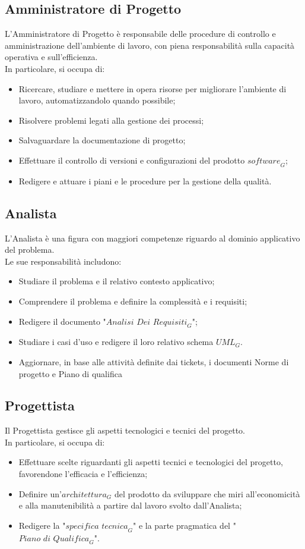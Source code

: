 \subsection{Amministratore di Progetto}
L'Amministratore di Progetto è responsabile delle procedure di controllo e amministrazione dell’ambiente di
lavoro, con piena responsabilità sulla capacità operativa e sull’efficienza.\\
In particolare, si occupa di:
\begin{itemize}
    \item Ricercare, studiare e mettere in opera risorse per migliorare l’ambiente di lavoro, automatizzandolo quando possibile;
    \item Risolvere problemi legati alla gestione dei processi;
    \item Salvaguardare la documentazione di progetto;
    \item Effettuare il controllo di versioni e configurazioni del prodotto $\textit{software}_G$;
    \item Redigere e attuare i piani e le procedure per la gestione della qualità.
\end{itemize}
\subsection{Analista}
L'Analista è una figura con maggiori competenze riguardo al dominio applicativo del problema. \\
Le sue responsabilità includono:
\begin{itemize}
    \item Studiare il problema e il relativo contesto applicativo;
    \item Comprendere il problema e definire la complessità e i requisiti;
    \item Redigere il documento "$\textit{Analisi Dei Requisiti}_G$";
    \item Studiare i casi d'uso e redigere il loro relativo schema $\textit{UML}_G$.
    \item Aggiornare, in base alle attività definite dai tickets, i documenti Norme di progetto e Piano di qualifica
\end{itemize}
\subsection{Progettista}
Il Progettista gestisce gli aspetti tecnologici e tecnici del progetto. \\
In particolare, si occupa di:
\begin{itemize}
    \item Effettuare scelte riguardanti gli aspetti tecnici e tecnologici del progetto, favorendone l'efficacia e l'efficienza;
    \item Definire un'$\textit{architettura}_G$ del prodotto da sviluppare che miri all'economicità e alla manutenibilità a partire dal lavoro svolto dall'Analista;
    \item Redigere la "$\textit{specifica tecnica}_G$" e la parte pragmatica del "$\textit{Piano di Qualifica}_G$".
\end{itemize}


